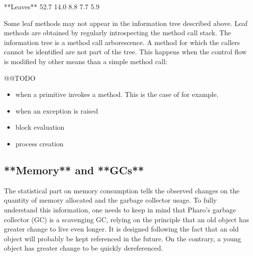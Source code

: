 \documentclass[a4paper,10pt,twoside]{book}
\begin{document}
\begin{code}
**Leaves**
52.7%
14.0%
8.8%
7.7%
5.9%
\end{code}

Some leaf methods may not appear in the information tree described above. Leaf methods are obtained by regularly introspecting the method call stack. The information tree is a method call arborescence. A method for which the callers cannot be identified are not part of the tree. This happens when the control flow is modified by other means than a simple method call: 

@@TODO
\begin{itemize}
\item when a primitive invokes a method. This is the case of  for example. 
\item when an exception is raised
\item block evaluation
\item process creation
\end{itemize}



 \subsection{**Memory** and **GCs**}

The statistical part on memory consumption tells the observed changes on the quantity of memory allocated and the garbage collector usage. To fully understand this information, one needs to keep in mind that Pharo's garbage collector (GC) is a scavenging GC, relying on the principle that an old object has greater change to live even longer. It is designed following the fact that an old object will probably be kept referenced in the future. On the contrary, a young object has greater change to be quickly dereferenced. 
\end{document}
